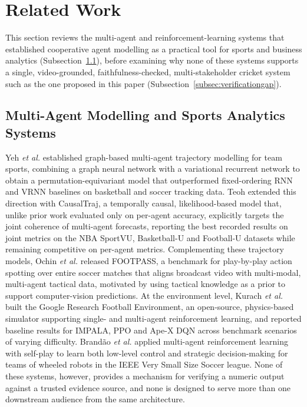 \section{Related Work}
\label{sec:relatedwork}

This section reviews the multi-agent and reinforcement-learning systems that established cooperative agent modelling as a practical tool for sports and business analytics (Subsection~\ref{subsec:magentsystems}), before examining why none of these systems supports a single, video-grounded, faithfulness-checked, multi-stakeholder cricket system such as the one proposed in this paper (Subsection~\ref{subsec:verificationgap}).

\subsection{Multi-Agent Modelling and Sports Analytics Systems}
\label{subsec:magentsystems}
Yeh \textit{et al.} \cite{ref1} established graph-based multi-agent trajectory modelling for team sports, combining a graph neural network with a variational recurrent network to obtain a permutation-equivariant model that outperformed fixed-ordering RNN and VRNN baselines on basketball and soccer tracking data. Teoh \cite{ref2} extended this direction with CausalTraj, a temporally causal, likelihood-based model that, unlike prior work evaluated only on per-agent accuracy, explicitly targets the joint coherence of multi-agent forecasts, reporting the best recorded results on joint metrics on the NBA SportVU, Basketball-U and Football-U datasets while remaining competitive on per-agent metrics. Complementing these trajectory models, Ochin \textit{et al.} \cite{ref3} released FOOTPASS, a benchmark for play-by-play action spotting over entire soccer matches that aligns broadcast video with multi-modal, multi-agent tactical data, motivated by using tactical knowledge as a prior to support computer-vision predictions.
At the environment level, Kurach \textit{et al.} \cite{ref4} built the Google Research Football Environment, an open-source, physics-based simulator supporting single- and multi-agent reinforcement learning, and reported baseline results for IMPALA, PPO and Ape-X DQN across benchmark scenarios of varying difficulty. Brand\~ao \textit{et al.} \cite{ref5} applied multi-agent reinforcement learning with self-play to learn both low-level control and strategic decision-making for teams of wheeled robots in the IEEE Very Small Size Soccer league.
None of these systems, however, provides a mechanism for verifying a numeric output against a trusted evidence source, and none is designed to serve more than one downstream audience from the same architecture.

